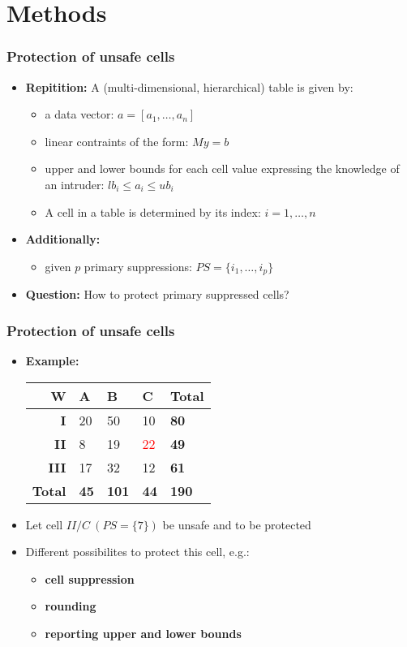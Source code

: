 \section{Methods}
\begin{frame}\frametitle{Protection of unsafe cells}
	\begin{itemize}
		\item {\bf Repitition:} A (multi-dimensional, hierarchical) table is given by: \pause
		\begin{itemize}
			\item a data vector: $a = [a_1,\ldots, a_n]$ \pause
			\item linear contraints of the form: $M y = b$ \pause
			\item upper and lower bounds for each cell value expressing the knowledge of an intruder: $lb_i \leq a_i \leq ub_i$	\pause
			\item A cell in a table is determined by its index: $i=1,\ldots,n$ \pause
		\end{itemize}
		\item {\bf Additionally:}
		\begin{itemize}
			\item given $p$ primary suppressions: $PS=\{i_1,\ldots,i_p\}$ \pause
		\end{itemize}
		\item {\bf Question:} How to protect primary suppressed cells?
		\end{itemize}
\end{frame}

\begin{frame}\frametitle{Protection of unsafe cells}
	\begin{itemize}
		\item {\bf Example:} \\
		\begin{center}
			\begin{tabular}{|r|lll|l|}
			\hline
			{\bf W} & {\bf A} & {\bf B} & {\bf C} & {\bf Total} \\
			\hline
			{\bf I} 	& 20 & 50 & 10 & {\bf 80} \\
			{\bf II} 	& 8 & 19 & \textcolor{red}{22} & {\bf 49} \\
			{\bf III} & 17 & 32 & 12 & {\bf 61} \\
			\hline
			{\bf Total} & {\bf 45} & {\bf 101} & {\bf 44} & {\bf 190} \\
			\hline
			\end{tabular}
		\end{center}		\pause
		\item Let cell $II/C ~ (PS=\{7\})$ be unsafe and to be protected
		\item Different possibilites to protect this cell, e.g.:
		\begin{itemize}
			\item \bf {cell suppression}
			\item \bf {rounding}
			\item \bf {reporting upper and lower bounds}
		\end{itemize}
	\end{itemize}
\end{frame}

